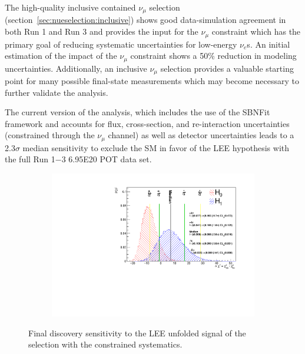 \par The high-quality inclusive contained $\nu_{\mu}$ selection (section~\ref{sec:nueselection:inclusive}) shows good data-simulation agreement in both Run 1 and Run 3 and provides the input for the $\nu_{\mu}$ constraint which has the primary goal of reducing systematic uncertainties for low-energy $\nu_e$s. An initial estimation of the impact of the $\nu_{\mu}$ constraint shows a 50\% reduction in modeling uncertainties. Additionally, an inclusive $\nu_{\mu}$ selection provides a valuable starting point for many possible final-state measurements which may become necessary to further validate the analysis. 
\par The current version of the analysis, which includes the use of the SBNFit framework and accounts for flux, cross-section, and re-interaction uncertainties (constrained through the $\nu_{\mu}$ channel) as well as detector uncertainties leads to a 2.3$\sigma$ median sensitivity to exclude the SM in favor of the LEE hypothesis with the full Run 1$-$3 6.95E20 POT data set. 
\begin{figure}[H]
    \begin{center}
    \begin{subfigure}{0.55\textwidth}
    \includegraphics[width=1.00\textwidth]{Sensitivity/BDT_higheff/SBNfit_Cls_nue_1e0p_numu_reco_e_H1_newBDT_higheff_noCCMEC_constrained_detsys.pdf}
    \label{fig:sensitivity_bdt_loose_const:intro}
    \end{subfigure}
    \caption{Final discovery sensitivity to the LEE unfolded signal of the \npsel selection with the constrained systematics.}
    \end{center}
\end{figure}

